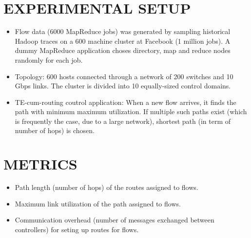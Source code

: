 \documentclass[portrait,a1]{a0poster}
\begin{document}
\begin{multicols}{2}
\section*{EXPERIMENTAL SETUP}
\color{DarkSlateGray}
\begin{itemize}
\item Flow data (6000 MapReduce jobs) was generated by sampling historical Hadoop traces on a 600 machine cluster at Facebook (1 million jobs). A dummy MapReduce application choses directory, map and reduce nodes randomly for each job.
\item Topology: 600 hosts connected through a network of 200 switches and 10 Gbps links. The cluster is divided into 10 equally-sized control domains.
\item TE-cum-routing coutrol application: When a new flow arrives, it finds the path with minimum maximum utilization. If multiple such paths exist (which is frequently the case, due to a large network), shortest path (in term of number of hops) is chosen.
\end{itemize}

\color{SaddleBrown}
\section*{METRICS}
\color{DarkSlateGray}
\begin{itemize}
\item Path length (number of hops) of the routes assigned to flows.
\item Maximum link utilization of the path assigned to flows.
\item Communication overhead (number of messages exchanged between controllers) for seting up routes for flows.   
\end{itemize}




\end{multicols}
\end{document}
